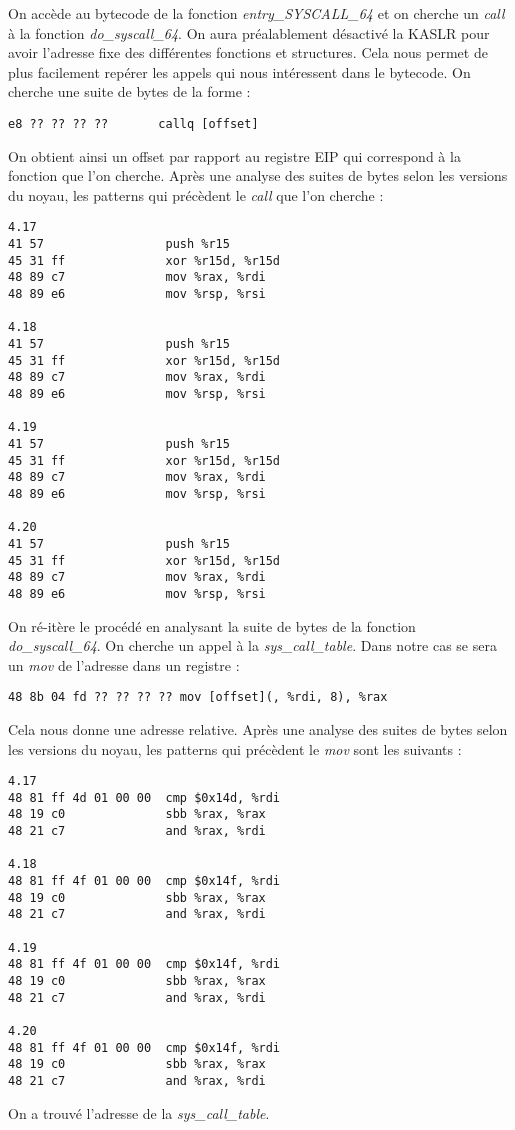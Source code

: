 \documentclass[journal, a4paper]{IEEEtran}
\begin{document}
On accède au bytecode de la fonction \textit{entry\_SYSCALL\_64} et on cherche un \textit{call} à la fonction \textit{do\_syscall\_64}. On aura préalablement désactivé la KASLR pour avoir l'adresse fixe des différentes fonctions et structures. Cela nous permet de plus facilement repérer les appels qui nous intéressent dans le bytecode. On cherche une suite de bytes de la forme :
\begin{lstlisting}[style=CStyle]
e8 ?? ?? ?? ??       callq [offset]
\end{lstlisting}
On obtient ainsi un offset par rapport au registre EIP qui correspond à la fonction que l'on cherche. Après une analyse des suites de bytes selon les versions du noyau, les patterns qui précèdent le \textit{call} que l'on cherche :
\begin{lstlisting}[style=CStyle]
4.17  
41 57                 push %r15  
45 31 ff              xor %r15d, %r15d  
48 89 c7              mov %rax, %rdi  
48 89 e6              mov %rsp, %rsi  

4.18  
41 57                 push %r15  
45 31 ff              xor %r15d, %r15d  
48 89 c7              mov %rax, %rdi  
48 89 e6              mov %rsp, %rsi  

4.19  
41 57                 push %r15  
45 31 ff              xor %r15d, %r15d  
48 89 c7              mov %rax, %rdi  
48 89 e6              mov %rsp, %rsi  

4.20  
41 57                 push %r15  
45 31 ff              xor %r15d, %r15d  
48 89 c7              mov %rax, %rdi  
48 89 e6              mov %rsp, %rsi  
\end{lstlisting}

On ré-itère le procédé en analysant la suite de bytes de la fonction \textit{do\_syscall\_64}. On cherche un appel à la \textit{sys\_call\_table}. Dans notre cas se sera un \textit{mov} de l'adresse dans un registre :
\begin{lstlisting}[style=CStyle]
48 8b 04 fd ?? ?? ?? ?? mov [offset](, %rdi, 8), %rax
\end{lstlisting}
Cela nous donne une adresse relative. Après une analyse des suites de bytes selon les versions du noyau, les patterns qui précèdent le \textit{mov} sont les suivants :
\begin{lstlisting}[style=CStyle]
4.17  
48 81 ff 4d 01 00 00  cmp $0x14d, %rdi  
48 19 c0              sbb %rax, %rax  
48 21 c7              and %rax, %rdi  

4.18  
48 81 ff 4f 01 00 00  cmp $0x14f, %rdi  
48 19 c0              sbb %rax, %rax  
48 21 c7              and %rax, %rdi  

4.19  
48 81 ff 4f 01 00 00  cmp $0x14f, %rdi  
48 19 c0              sbb %rax, %rax  
48 21 c7              and %rax, %rdi  

4.20  
48 81 ff 4f 01 00 00  cmp $0x14f, %rdi  
48 19 c0              sbb %rax, %rax  
48 21 c7              and %rax, %rdi  
\end{lstlisting}
On a trouvé l'adresse de la \textit{sys\_call\_table}. 
\end{document}
